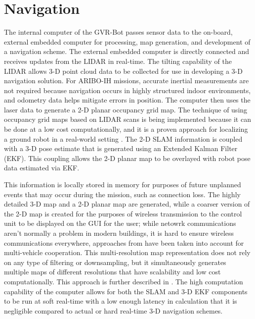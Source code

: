 \section{Navigation}\label{sec:navigation}

The internal computer of the GVR-Bot passes sensor data to the on-board, external embedded computer for processing, map generation, and development of a navigation scheme. The external embedded computer is directly connected and receives updates from the LIDAR in real-time. The tilting capability of the LIDAR allows 3-D point cloud data to be collected for use in developing a 3-D navigation solution. For ARIBO-IH missions, accurate inertial measurements are not required because navigation occurs in highly structured indoor environments, and odometry data helps mitigate errors in position. The computer then uses the laser data to generate a 2-D planar occupancy grid map. The technique of using occupancy grid maps based on LIDAR scans is being implemented because it can be done at a low cost computationally, and it is a proven approach for localizing a ground robot in a real-world setting \cite{thrun2005probabilistic,kohlbrecher2011flexible}. The 2-D SLAM information is coupled with a 3-D pose estimate that is generated using an Extended Kalman Filter (EKF). This coupling allows the 2-D planar map to be overlayed with robot pose data estimated via EKF. 

This information is locally stored in memory for purposes of future unplanned events that may occur during the mission, such as connection loss. The highly detailed 3-D map and a 2-D planar map are generated, while a coarser version of the 2-D map is created for the purposes of wireless transmission to the control unit to be displayed on the GUI for the user; while netowrk communications aren't normally a problem in modern buildings, it is hard to ensure wireless communications everywhere, approaches from \cite{ABK09} have been taken into account for multi-vehicle cooperation. This multi-resolution map representation does not rely on any type of filtering or downsampling, but it simultaneously generates multiple maps of different resolutions that have scalability and low cost computationally. This approach is further described in \cite{kohlbrecher2011flexible,habbecke2006iterative}. The high computation capability of the computer allows for both the SLAM and 3-D EKF components to be run at soft real-time with a low enough latency in calculation that it is negligible compared to actual or hard real-time 3-D navigation schemes.

